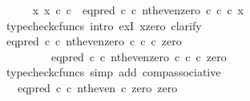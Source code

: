 \begin{isabellebody}
\ \ \ \ \isamarkupfalse%
\ {\isachardoublequoteopen}{\isasymexists}x{\isachardot}{\kern0pt}\ x\ {\isasymin}\isactrlsub c\ {\isasymnat}\isactrlsub c\ {\isasymand}\ {\isacharparenleft}{\kern0pt}eq{\isacharunderscore}{\kern0pt}pred\ {\isasymnat}\isactrlsub c\ {\isasymcirc}\isactrlsub c\ {\isasymlangle}nth{\isacharunderscore}{\kern0pt}even{\isacharcomma}{\kern0pt}zero\ {\isasymcirc}\isactrlsub c\ {\isasymbeta}\isactrlbsub {\isasymnat}\isactrlsub c\isactrlesub {\isasymrangle}{\isacharparenright}{\kern0pt}\ {\isasymcirc}\isactrlsub c\ x\ {\isacharequal}{\kern0pt}\ {\isasymt}{\isachardoublequoteclose}\isanewline
\ \ \ \ \isamarkupfalse%
\ {\isacharparenleft}{\kern0pt}typecheck{\isacharunderscore}{\kern0pt}cfuncs{\isacharcomma}{\kern0pt}\ intro\ exI{\isacharbrackleft}{\kern0pt}\ x{\isacharequal}{\kern0pt}{\isachardoublequoteopen}zero{\isachardoublequoteclose}{\isacharbrackright}{\kern0pt}{\isacharcomma}{\kern0pt}\ clarify{\isacharparenright}{\kern0pt}\isanewline
\ \ \ \ \ \ \isamarkupfalse%
\ {\isachardoublequoteopen}{\isacharparenleft}{\kern0pt}eq{\isacharunderscore}{\kern0pt}pred\ {\isasymnat}\isactrlsub c\ {\isasymcirc}\isactrlsub c\ {\isasymlangle}nth{\isacharunderscore}{\kern0pt}even{\isacharcomma}{\kern0pt}zero\ {\isasymcirc}\isactrlsub c\ {\isasymbeta}\isactrlbsub {\isasymnat}\isactrlsub c\isactrlesub {\isasymrangle}{\isacharparenright}{\kern0pt}\ {\isasymcirc}\isactrlsub c\ zero\isanewline
\ \ \ \ \ \ \ \ {\isacharequal}{\kern0pt}\ eq{\isacharunderscore}{\kern0pt}pred\ {\isasymnat}\isactrlsub c\ {\isasymcirc}\isactrlsub c\ {\isasymlangle}nth{\isacharunderscore}{\kern0pt}even{\isacharcomma}{\kern0pt}zero\ {\isasymcirc}\isactrlsub c\ {\isasymbeta}\isactrlbsub {\isasymnat}\isactrlsub c\isactrlesub {\isasymrangle}\ {\isasymcirc}\isactrlsub c\ zero{\isachardoublequoteclose}\isanewline
\ \ \ \ \ \ \ \ \isamarkupfalse%
\ {\isacharparenleft}{\kern0pt}typecheck{\isacharunderscore}{\kern0pt}cfuncs{\isacharcomma}{\kern0pt}\ simp\ add{\isacharcolon}{\kern0pt}\ comp{\isacharunderscore}{\kern0pt}associative{}{\isacharparenright}{\kern0pt}\isanewline
\ \ \ \ \ \ \isamarkupfalse%
\ \isamarkupfalse%
\ {\isachardoublequoteopen}{\isachardot}{\kern0pt}{\isachardot}{\kern0pt}{\isachardot}{\kern0pt}\ {\isacharequal}{\kern0pt}\ eq{\isacharunderscore}{\kern0pt}pred\ {\isasymnat}\isactrlsub c\ {\isasymcirc}\isactrlsub c\ {\isasymlangle}nth{\isacharunderscore}{\kern0pt}even\ {\isasymcirc}\isactrlsub c\ zero{\isacharcomma}{\kern0pt}\ zero{\isasymrangle}{\isachardoublequoteclose}\isanewline

\end{isabellebody}
